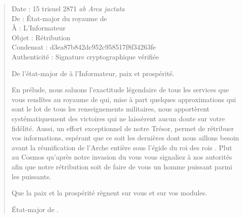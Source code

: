 \begin{quotation}
  \ttfamily\RaggedRight
  \noindent{}Date : 15 trisuel 2871 \emph{ab Arca jactata}\\
  De : État-major du royaume de \campoppose{}\\
  À : L’Informateur\\
  Objet : Rétribution\\
  Condensat : d3ea87b842dc952c958517f8f34263fe\\
  Authenticité : Signature cryptographique vérifiée
  \nopagebreak\vspace{1em}

  De l’état-major de \campoppose{} à l’Informateur, paix et prospérité.
  \nopagebreak\vspace{1em}

  En prélude, nous saluons l’exactitude légendaire de tous les services que vous rendîtes au royaume de \campoppose{} qui, mise à part quelques approximations qui sont le lot de tous les renseignements militaires, nous apportèrent systématiquement des victoires qui ne laissèrent aucun doute sur votre fidélité. Aussi, un effort exceptionnel de notre Trésor, permet de rétribuer vos informations, espérant que ce soit les dernières dont nous aillons besoin avant la réunification de l’Arche entière sous l’égide du roi des rois \darius.
  Plut au Cosmos qu’après notre invasion du \campprincipal{} vous vous signaliez à nos autorités afin que notre rétribution soit de faire de vous un homme puissant parmi les puissants.

  \nopagebreak\vspace{1em}
  Que la paix et la prospérité règnent sur vous et sur vos modules.

  \nopagebreak\vspace{1em}
  \hfill État-major de \campoppose{}.
\end{quotation}

\scene

\StageDirII{\ela, \roi}


